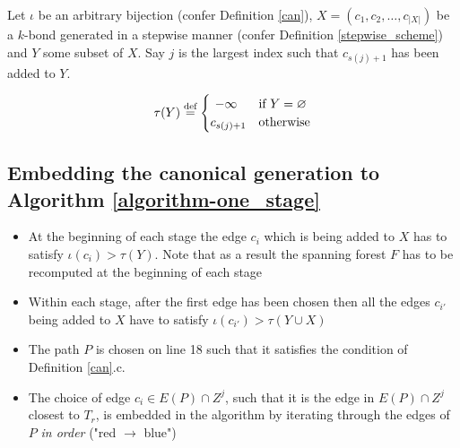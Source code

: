 \begin{defn}
	\label{def:tau}
	Let $\iota$ be an arbitrary bijection (confer Definition \ref{can}), $X = (c_1, c_2,\ldots,c_{\lvert X \rvert})$ be a $k$-bond generated in a stepwise manner (confer Definition \ref{stepwise_scheme}) and $Y$ some subset of $X$. Say $j$ is the largest index such that $c_{s(j)+1}$ has been added to $Y$.

	\[
		\tau(Y) \stackrel{\text{def}}{=}
		\begin{cases}
			\hfill -\infty    \hfill & \text{if $Y = \varnothing$} \\
			\hfill c_{s(j)+1} \hfill & \text{otherwise} \\
		\end{cases}
	\]

\end{defn}


\subsection*{Embedding the canonical generation to Algorithm \ref{algorithm-one_stage}}

\begin{itemize}
	\item At the beginning of each stage the edge $c_i$ which is being added to $X$ has to satisfy $\iota(c_i) > \tau(Y)$. Note that as a result the spanning forest $F$ has to be recomputed at the beginning of each stage

	\item Within each stage, after the first edge has been chosen then all the edges $c_{i'}$ being added to $X$ have to satisfy $\iota(c_{i'}) > \tau(Y \cup X)$

	\item The path $P$ is chosen on line 18 such that it satisfies the condition of Definition \ref{can}.c.

	\item The choice of edge $c_i \in E(P) \cap Z^j$, such that it is the edge in $E(P) \cap Z^j$ closest to $T_r$, is embedded in the algorithm by iterating through the edges of $P$ \textit{in order} ("red $\rightarrow$ blue")

\end{itemize}

\clearpage

